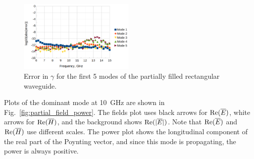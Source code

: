 \documentclass[titlepage]{article}
\renewcommand\_{\textunderscore\linebreak[1]}
\begin{document}
\begin{figure}[H]
  \centering
  \includegraphics[width=0.5\textwidth]{../regression/OpenParEM2D/partially_filled_rect_waveguide/PartFilled_order_6_study/screenshots/partial_gamma_error}
  \caption{Error in $\gamma$ for the first 5 modes of the partially filled rectangular waveguide.}
  \label{fig:partial_gamma_error}
\end{figure}

Plots of the dominant mode at 10~GHz are shown in Fig.~\ref{fig:partial_field_power}. The fields plot uses black arrows for $\textnormal{Re}(\overline{E})$, white arrows for $\textnormal{Re}(\overline{H})$, and the background shows $\textnormal{Re}(|\overline{E}|)$. Note that $\textnormal{Re}(\overline{E})$ and $\textnormal{Re}(\overline{H})$ use different scales. The power plot shows the longitudinal component of the real part of the Poynting vector, and since this mode is propagating, the power is always positive. 
\end{document}
